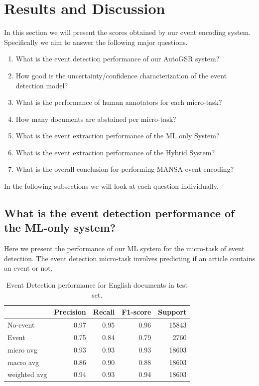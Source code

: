 \section{Results and Discussion}
In this section we will present the scores obtained by our event encoding system. Specifically we aim to answer the following major questions.

\begin{enumerate}
    \item What is the event detection performance of our AutoGSR system?
    \item How good is the uncertainty/confidence characterization of the event detection model?
    \item What is the performance of human annotators for each micro-task?
    \item How many documents are abstained per micro-task?
    \item What is the event extraction performance of the ML only System?
    \item What is the event extraction performance of the Hybrid System?
    \item What is the overall conclusion for performing MANSA event encoding?
\end{enumerate}
In the following subsections we will look at each question individually.

\subsection{What is the event detection performance of the ML-only system?}
Here we present the performance of our ML system for the micro-task of event detection. The event detection micro-task involves predicting if an article contains an event or not. 

\begin{table}
    \centering
   \begin{tabular}{lrrrr}
\toprule
{} &  Precision &  Recall &    F1-score &  Support \\
\midrule
No-event            &  0.97 &   0.95 &  0.96 &   15843 \\
Event               &  0.75 &   0.84 &  0.79 &   2760 \\
micro avg           &  0.93 &   0.93 &  0.93 &   18603 \\
macro avg           &  0.86 &   0.90 &  0.88 &   18603 \\
weighted avg        &  0.94 &   0.93 &  0.94 &   18603 \\
\bottomrule
\end{tabular}
    \caption{Event Detection performance for English documents in test set.}
    \label{tab:engDetection}
\end{table}


